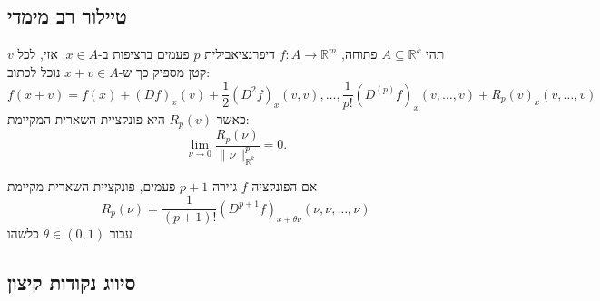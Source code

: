 \documentclass{tstextbook}
\begin{document}
\subsection{טיילור רב מימדי}

\begin{theorem}[טיילור]
תהי \(A\subseteq \mathbb{R}^k\) פתוחה, \(f:A\to\mathbb{R}^m\) דיפרנציאבילית \(p\) פעמים ברציפות ב-\(x \in A\). אזי, לכל \(v\) קטן מספיק כך ש-\(x+v\in A\) נוכל לכתוב:
$$\!\!\!\!f\left(x+v\right)\!=\!f\left(x\right)\!+\!\left(D f\right)_{x}\left(v\right)\!+\!\frac12\left(D^{2}f\right)_{x}\left(v,v\right),\ldots,\frac1{p!}\left(D^{(p)}f\right)_{x}\left(v,\ldots,v\right)\!+\!R_{p}\left(v\right)_{x}\left(v,\ldots,v\right)$$
כאשר \(R_{p}(v)\) היא פונקציית השארית המקיימת:
$$\operatorname*{lim}_{\nu\to0}{\frac{R_{p}(\nu)}{\|\nu\|_{\mathbb{R}^{k}}^{p}}}=0.$$

\end{theorem}
\begin{theorem}
אם הפונקציה \(f\) גזירה \(p+1\) פעמים, פונקציית השארית מקיימת 
$$R_{p}(\nu)=\frac{1}{(p+1)!}({D}^{p+1}f)_{x+\theta\nu}(\nu,\nu,\ldots,\nu)$$
עבור \(\theta \in(0,1)\) כלשהו

\end{theorem}
\subsection{סיווג נקודות קיצון}
\end{document}
